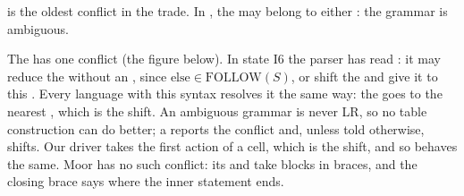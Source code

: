  is the oldest conflict in the trade. In , the  may belong to either : the grammar is ambiguous.

\label{lst:b3:bottom-up-parsing:ifelse}

The  has one conflict (the figure below). In state I6 the parser has read : it may reduce the  without an , since $\mathrm{else} \in \mathrm{FOLLOW}(S)$, or shift the  and give it to this . Every language with this syntax resolves it the same way: the  goes to the nearest , which is the shift. An ambiguous grammar is never LR, so no table construction can do better; a  reports the conflict and, unless told otherwise, shifts. Our driver takes the first action of a cell, which is the shift, and so behaves the same. Moor has no such conflict: its  and  take blocks in braces, and the closing brace says where the inner statement ends.

\begin{omfigure}
\par{}
\end{omfigure}

